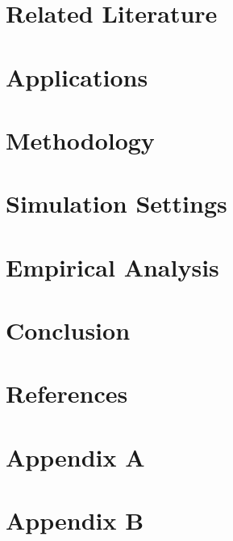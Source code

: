 \documentclass[12pt]{article}
\begin{document}
\section{Related Literature}

\clearpage

\section{Applications}

\clearpage

\section{Methodology}

\clearpage

\section{Simulation Settings}\label{sec:sim}

\clearpage

\section{Empirical Analysis}

\clearpage

\section{Conclusion}

\clearpage


\clearpage
\section*{References}
%
	\printbibliography[heading = none]
\clearpage
\section*{Appendix A}
%

\clearpage
\section*{Appendix B}
%

%
%
\end{document}

